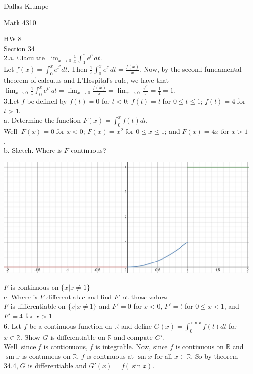 \documentclass[12pt]{article}
\begin{document}
\noindent Dallas Klumpe

\noindent Math 4310

\noindent HW 8\\
\noindent Section 34\\

2.a. Claculate $\lim_{x\rightarrow0}\frac1x\int_0^xe^{t^2}dt$.\\
Let $f(x)=\int_0^xe^{t^2}dt$. Then $\frac1x\int_0^xe^{t^2}dt=\frac{f(x)}{x}$. Now, by the second fundamental theorem of calculus and L'Hospital's rule, we have that $\lim_{x\rightarrow0}\frac1x\int_0^xe^{t^2}dt=\lim_{x\rightarrow0}\frac{f(x)}{x}=\lim_{x\rightarrow0}\frac{e^{x^2}}{1}=\frac11=1$.\\[20pt]

3.Let $f$ be defined by $f(t)=0$ for $t<0$; $f(t)=t$ for $0\leq t\leq1$; $f(t)=4$ for $t>1$.\\
a. Determine the function $F(x)=\int_0^xf(t)dt$.\\
Well, $F(x)=0$ for $x<0$; $F(x)=x^2$ for $0\leq x\leq1$; and $F(x)=4x$ for $x>1$.\\
b. Sketch. Where is $F$ continuous?\\
\begin{center}
	\includegraphics[scale=0.5]{graph F.JPG}\\
\end{center}
$F$ is continuous on $\{x|x\neq1\}$\\
c. Where is $F$ differentiable and find $F'$ at those values.\\
$F$ is differentiable on $\{x|x\neq1\}$ and $F'=0$ for $x<0$, $F'=t$ for $0\leq x<1$, and $F'=4$ for $x>1$.\\[20pt]

6. Let $f$ be a continuous function on $\mathbb{R}$ and define $G(x)=\int_0^{\sin x}f(t)dt$ for $x\in\mathbb{R}$. Show $G$ is differentiable on $\mathbb{R}$ and compute $G'$.\\
Well, since $f$ is contionuous, $f$ is integrable. Now, since $f$ is continuous on $\mathbb{R}$ and $\sin x$ is continuous on $\mathbb{R}$, $f$ is continuous at $\sin x$ for all $x\in\mathbb{R}$. So by theorem 34.4, $G$ is differentiable and $G'(x)=f(\sin x)$.\\[20pt]
\end{document}
